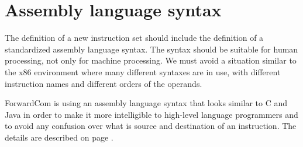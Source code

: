 \documentclass[forwardcom.tex]{subfiles}
\begin{document}
\section{Assembly language syntax} \label{StandardizationAssemblySyntax}
The definition of a new instruction set should include the definition of a standardized assembly language syntax. The syntax should be suitable for human processing, not only for machine processing. We must avoid a situation similar to the x86 environment where many different syntaxes are in use, with different instruction names and different orders of the operands. 
\vv

ForwardCom is using an assembly language syntax that looks similar to C and Java in order to make it more intelligible to high-level language programmers and to avoid any confusion over what is source and destination of an instruction. The details are described on page \pageref{AssemblyLanguageSyntax}.
\end{document}
